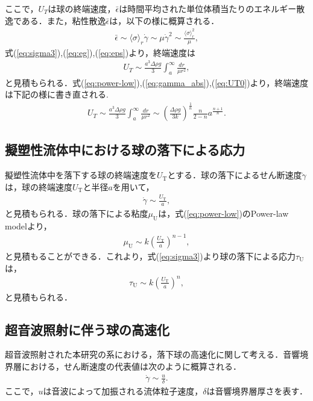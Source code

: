 ここで，$U_T$は球の終端速度，$\bar{\epsilon}$は時間平均された単位体積当たりのエネルギー散逸である．また，粘性散逸$\bar{\epsilon}$は，以下の様に概算される．
\begin{eqnarray}
    \bar{\epsilon} \sim \langle\sigma\rangle_r\dot{\gamma} \sim \mu \dot{\gamma}^2 \sim \frac{\langle\sigma\rangle_r^2}{\mu} ,
    \label{eq:eps}
\end{eqnarray}
式(\ref{eq:sigma3}),(\ref{eq:eg}),(\ref{eq:eps})より，終端速度は
\begin{eqnarray}
    U_T \sim \frac{a^3\Delta\rho g}{3}\int_a^\infty\frac{dr}{\mu r^2} ,
    \label{eq:UT0}
\end{eqnarray}
と見積もられる．式(\ref{eq:power-low}),(\ref{eq:gamma_abs}),(\ref{eq:UT0})より，終端速度は下記の様に書き直される.
\begin{eqnarray}
    U_T \sim \frac{a^3\Delta\rho g}{3}  \int^{\infty}_{a} \frac{dr}{\mu r^2} \sim \left(\frac{\Delta \rho g}{3k}\right)^{\frac{1}{n}}\frac{n}{2-n}a^{\frac{n+1}{n}} .
    \label{eq:UT}
\end{eqnarray}

\subsection{擬塑性流体中における球の落下による応力}
擬塑性流体中を落下する球の終端速度を$U_\text{T}$とする．球の落下によるせん断速度$\dot{\gamma}$は，球の終端速度$U_\text{T}$と半径$a$を用いて，
\begin{eqnarray}
    \dot{\gamma} \sim \frac{U_\text{T}}{a},
    \label{eq:UTgamma}
\end{eqnarray}
と見積もられる．球の落下による粘度$\mu_\text{U}$は，式(\ref{eq:power-low})のPower-law modelより，
\begin{eqnarray}
    \mu_\text{U} \sim k \left(\frac{U_\text{T}}{a}\right)^{n-1} ,
    \label{eq:muU}
\end{eqnarray}
と見積もることができる．これより，式(\ref{eq:sigma3})より球の落下による応力$\tau_\text{U}$は，
\begin{eqnarray}
    \tau_\text{U} \sim k \left(\frac{U_\text{T}}{a}\right)^n ,
    \label{eq:tauU}
\end{eqnarray}
と見積もられる．

\subsection{超音波照射に伴う球の高速化}
\label{sec:UTdiff}
超音波照射された本研究の系における，落下球の高速化に関して考える．音響境界層における，せん断速度の代表値は次のように概算される．
\begin{eqnarray}
    \dot{\gamma} \sim \frac{u}{\delta} .
    \label{eq:abl-delta}
\end{eqnarray}
ここで，$u$は音波によって加振される流体粒子速度，$\delta$は音響境界層厚さを表す．


